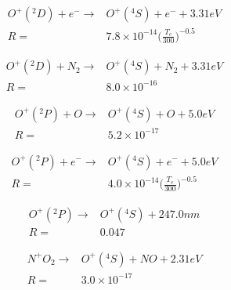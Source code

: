 \documentclass[twoside,10pt]{book}
\begin{document}
\begin{equation}
\begin{split}
O^+(^2D) + e^- \rightarrow & O^+(^4S) + e^- + 3.31 eV  \\
R = & 7.8 \times 10^{-14}\bigg(\frac{T_e}{300}\bigg)^{-0.5}
\end{split}
\end{equation}

\begin{equation}
\begin{split}
O^+(^2D) + N_2 \rightarrow & O^+(^4S) + N_2 + 3.31 eV  \\
R = & 8.0 \times 10^{-16}
\end{split}
\end{equation}

\begin{equation}
\begin{split}
O^+(^2P) + O \rightarrow & O^+(^4S) + O + 5.0 eV  \\
R = & 5.2 \times 10^{-17}
\end{split}
\end{equation}

\begin{equation}
\begin{split}
O^+(^2P) + e^- \rightarrow & O^+(^4S) + e^- + 5.0 eV  \\
R = & 4.0 \times 10^{-14}\bigg(\frac{T_e}{300}\bigg)^{-0.5}
\end{split}
\end{equation}

\begin{equation}
\begin{split}
O^+(^2P) \rightarrow &  O^+(^4S) + 247.0nm\\
R = & 0.047
\end{split}
\end{equation}

\begin{equation}
\begin{split}
N^+ O_2 \rightarrow &  O^+(^4S) + NO + 2.31 eV\\
R = & 3.0 \times 10^{-17}
\end{split}
\end{equation}
\end{document}

